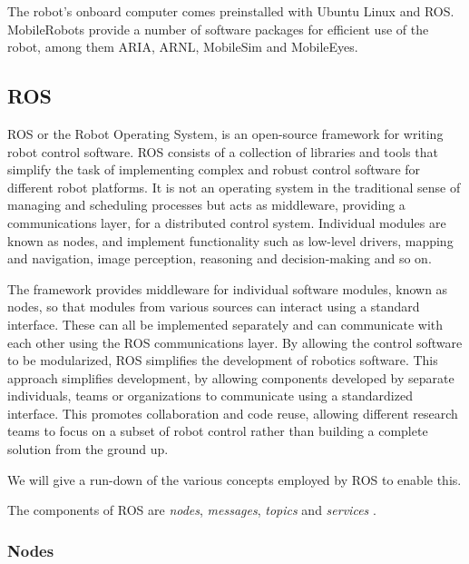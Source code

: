 \documentclass[\rootfolder/main.tex]{subfiles}
\begin{document}
The robot's onboard computer comes preinstalled with Ubuntu Linux and ROS.
MobileRobots provide a number of software packages for efficient use of the robot, among them ARIA, ARNL, MobileSim and MobileEyes.


\subsection{ROS}

ROS or the Robot Operating System, is an open-source framework for writing robot control software.
ROS consists of a collection of libraries and tools that simplify the task of implementing complex and robust control software for different robot platforms.
It is not an operating system in the traditional sense of managing and scheduling processes but acts as middleware, providing a communications layer, for a distributed control system.
Individual modules are known as nodes, and implement functionality such as low-level drivers, mapping and navigation, image perception, reasoning and decision-making and so on.

The framework provides middleware for individual software modules, known as nodes, so that modules from various sources can interact using a standard interface.
These can all be implemented separately and can communicate with each other using the ROS communications layer.
By allowing the control software to be modularized, ROS simplifies the development of robotics software.
This approach simplifies development, by allowing components developed by separate individuals, teams or organizations to communicate using a standardized interface.
This promotes collaboration and code reuse, allowing different research teams to focus on a subset of robot control rather than building a complete solution from the ground up.

We will give a run-down of the various concepts employed by ROS to enable this.

The components of ROS are \emph{nodes}, \emph{messages}, \emph{topics} and \emph{services} \cite{Quigley2009}.

\subsubsection{Nodes}
\end{document}
